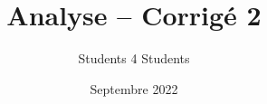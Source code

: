 \documentclass[11.5pt,french,table]{article}
\title{Analyse -- Corrigé 2}
\author{Students 4 Students}
\date{Septembre 2022}
\theoremstyle{exercice}
\begin{document}
\maketitle

{
\let\clearpage\relax %



}
\end{document}
